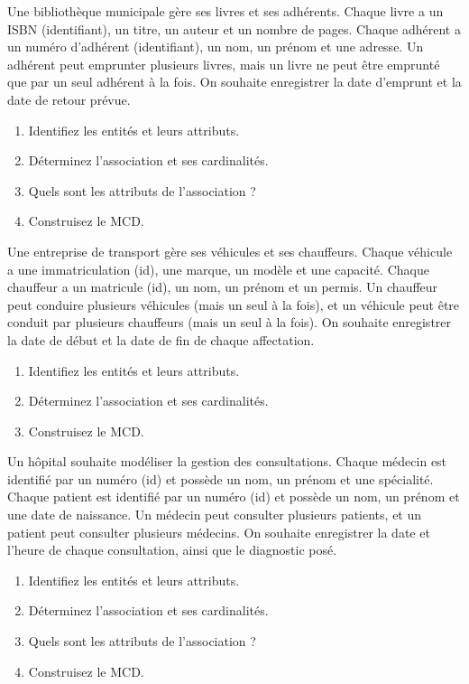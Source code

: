 \exo{}
Une bibliothèque municipale gère ses livres et ses adhérents. Chaque livre a un ISBN (identifiant), un titre, un auteur et un nombre de pages. Chaque adhérent a un numéro d'adhérent (identifiant), un nom, un prénom et une adresse. Un adhérent peut emprunter plusieurs livres, mais un livre ne peut être emprunté que par un seul adhérent à la fois. On souhaite enregistrer la date d'emprunt et la date de retour prévue.
\begin{enumerate}
    \item Identifiez les entités et leurs attributs.
    \item Déterminez l'association et ses cardinalités.
    \item Quels sont les attributs de l'association ?
    \item Construisez le MCD.
\end{enumerate}

\exo{}
Une entreprise de transport gère ses véhicules et ses chauffeurs. Chaque véhicule a une immatriculation (id), une marque, un modèle et une capacité. Chaque chauffeur a un matricule (id), un nom, un prénom et un permis. Un chauffeur peut conduire plusieurs véhicules (mais un seul à la fois), et un véhicule peut être conduit par plusieurs chauffeurs (mais un seul à la fois). On souhaite enregistrer la date de début et la date de fin de chaque affectation.
\begin{enumerate}
    \item Identifiez les entités et leurs attributs.
    \item Déterminez l'association et ses cardinalités.
    \item Construisez le MCD.
\end{enumerate}

\exo{}
Un hôpital souhaite modéliser la gestion des consultations. Chaque médecin est identifié par un numéro (id) et possède un nom, un prénom et une spécialité. Chaque patient est identifié par un numéro (id) et possède un nom, un prénom et une date de naissance. Un médecin peut consulter plusieurs patients, et un patient peut consulter plusieurs médecins. On souhaite enregistrer la date et l'heure de chaque consultation, ainsi que le diagnostic posé.
\begin{enumerate}
    \item Identifiez les entités et leurs attributs.
    \item Déterminez l'association et ses cardinalités.
    \item Quels sont les attributs de l'association ?
    \item Construisez le MCD.
\end{enumerate}

